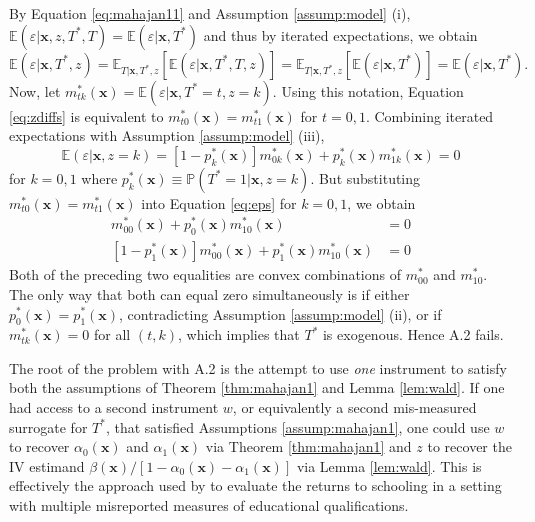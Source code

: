 By Equation \ref{eq:mahajan11} and Assumption \ref{assump:model} (i), $\mathbb{E}(\varepsilon|\mathbf{x},z,T^*,T)=\mathbb{E}(\varepsilon|\mathbf{x},T^*)$ and thus by iterated expectations, we obtain
\begin{equation}
  \mathbb{E}(\varepsilon|\mathbf{x},T^*,z) = \mathbb{E}_{T|\mathbf{x},T^*,z}\left[ \mathbb{E}(\varepsilon|\mathbf{x},T^*,T,z) \right] = \mathbb{E}_{T|\mathbf{x},T^*,z}\left[ \mathbb{E}(\varepsilon|\mathbf{x},T^*) \right] = \mathbb{E}(\varepsilon|\mathbf{x}, T^*).
  \label{eq:zdiffs}
\end{equation}
Now, let $m^*_{tk}(\mathbf{x}) = \mathbb{E}(\varepsilon|\mathbf{x}, T^*=t,z=k)$.
Using this notation, Equation \ref{eq:zdiffs} is equivalent to $m^*_{t0}(\mathbf{x}) = m^*_{t1}(\mathbf{x})$ for $t = 0, 1$.
Combining iterated expectations with Assumption \ref{assump:model} (iii), 
\begin{equation}
  \mathbb{E}(\varepsilon|\mathbf{x},z=k) = [1 - p^*_k(\mathbf{x})] m^*_{0k}(\mathbf{x}) + p^*_k(\mathbf{x}) m^*_{1k}(\mathbf{x}) = 0 
  \label{eq:eps}
\end{equation}
for $k = 0,1$ where $p^*_k(\mathbf{x}) \equiv \mathbb{P}(T^*=1|\mathbf{x}, z=k)$.
But substituting $m^*_{t0}(\mathbf{x}) = m^*_{t1}(\mathbf{x})$ into Equation \ref{eq:eps} for $k=0,1$, we obtain 
\begin{align*}
  [1 - p^*_0(\mathbf{x})] m^*_{00}(\mathbf{x}) + p^*_0(\mathbf{x}) m^*_{10}(\mathbf{x}) &= 0\\ 
  [1 - p^*_1(\mathbf{x})] m^*_{00}(\mathbf{x}) + p^*_1(\mathbf{x}) m^*_{10}(\mathbf{x}) &= 0
\end{align*}
Both of the preceding two equalities are convex combinations of $m^*_{00}$ and $m^*_{10}$.
The only way that both can equal zero simultaneously is if either $p^*_0(\mathbf{x}) = p^*_1(\mathbf{x})$, contradicting Assumption \ref{assump:model} (ii), or if $m^*_{tk}(\mathbf{x}) = 0$ for all $(t,k)$, which implies that $T^*$ is exogenous.
Hence \cite{Mahajan} A.2 fails.

The root of the problem with A.2 is the attempt to use \emph{one} instrument to satisfy both the assumptions of Theorem \ref{thm:mahajan1} and Lemma \ref{lem:wald}.
If one had access to a second instrument $w$, or equivalently a second mis-measured surrogate for $T^*$, that satisfied Assumptions \ref{assump:mahajan1}, one could use $w$  to recover $\alpha_0(\mathbf{x})$ and $\alpha_1(\mathbf{x})$ via Theorem \ref{thm:mahajan1} and $z$ to recover the IV estimand $\beta(\mathbf{x}) / [1 - \alpha_0(\mathbf{x}) - \alpha_1(\mathbf{x})]$ via Lemma \ref{lem:wald}.
This is effectively the approach used by \cite{Batt} to evaluate the returns to schooling in a setting with multiple misreported measures of educational qualifications.

